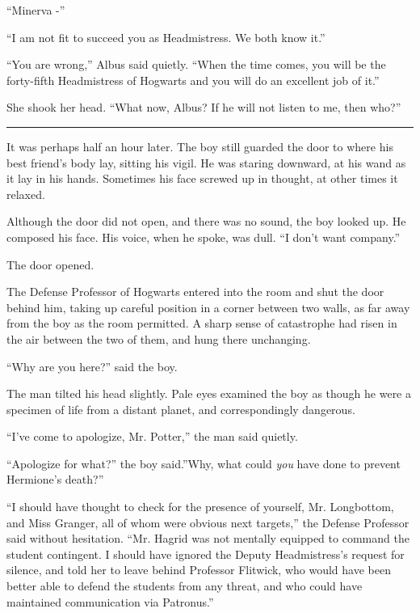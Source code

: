``Minerva -''

``I am not fit to succeed you as Headmistress. We both know it.''

``You are wrong,'' Albus said quietly. ``When the time comes, you will
be the forty-fifth Headmistress of Hogwarts and you will do an excellent
job of it.''

She shook her head. ``What now, Albus? If he will not listen to me, then
who?''

\begin{center}\rule{3in}{0.4pt}\end{center}

It was perhaps half an hour later. The boy still guarded the door to
where his best friend's body lay, sitting his vigil. He was staring
downward, at his wand as it lay in his hands. Sometimes his face screwed
up in thought, at other times it relaxed.

Although the door did not open, and there was no sound, the boy looked
up. He composed his face. His voice, when he spoke, was dull. ``I don't
want company.''

The door opened.

The Defense Professor of Hogwarts entered into the room and shut the
door behind him, taking up careful position in a corner between two
walls, as far away from the boy as the room permitted. A sharp sense of
catastrophe had risen in the air between the two of them, and hung there
unchanging.

``Why are you here?'' said the boy.

The man tilted his head slightly. Pale eyes examined the boy as though
he were a specimen of life from a distant planet, and correspondingly
dangerous.

``I've come to apologize, Mr. Potter,'' the man said quietly.

``Apologize for what?'' the boy said.''Why, what could \emph{you} have
done to prevent Hermione's death?''

``I should have thought to check for the presence of yourself, Mr.
Longbottom, and Miss Granger, all of whom were obvious next targets,''
the Defense Professor said without hesitation. ``Mr. Hagrid was not
mentally equipped to command the student contingent. I should have
ignored the Deputy Headmistress's request for silence, and told her to
leave behind Professor Flitwick, who would have been better able to
defend the students from any threat, and who could have maintained
communication via Patronus.''

